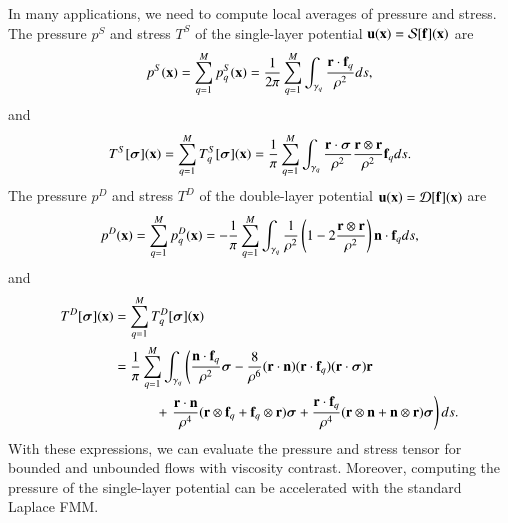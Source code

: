 In many applications, we need to compute local averages of pressure and stress.  The pressure $p^{S}$ and stress $T^{S}$ of the single-layer potential ${\mathbf{u}}({\mathbf{x}}) = {\mathcal{S}}[{\mathbf{f}}]({\mathbf{x}})$ are 
\begin{align*}
  p^{S}({\mathbf{x}}) = \sum_{q=1}^{M} p_{q}^{S}({\mathbf{x}}) = 
    \frac{1}{2\pi} \sum_{q=1}^{M}\int_{\gamma_{q}}
    \frac{{\mathbf{r}} \cdot {\mathbf{f}}_{q}}{\rho^{2}} ds,
\end{align*}
and
\begin{align*}
  T^{S}[{\boldsymbol\sigma}]({\mathbf{x}}) = \sum_{q=1}^{M} T_{q}^{S}[{\boldsymbol\sigma}]({\mathbf{x}}) = 
    \frac{1}{\pi}\sum_{q=1}^{M} \int_{\gamma_{q}} 
    \frac{{\mathbf{r}} \cdot {\boldsymbol\sigma}}{\rho^{2}} 
    \frac{{\mathbf{r}} \otimes {\mathbf{r}}}{\rho^{2}}{\mathbf{f}}_{q} ds.
\end{align*}
The pressure $p^{D}$ and stress $T^{D}$ of the double-layer potential
${\mathbf{u}}({\mathbf{x}}) = {\mathcal{D}}[{\mathbf{f}}]({\mathbf{x}})$ are
\begin{align*}
  p^{D}({\mathbf{x}}) = \sum_{q=1}^{M} p_{q}^{D}({\mathbf{x}}) =
    -\frac{1}{\pi}\sum_{q=1}^{M}\int_{\gamma_{q}}
    \frac{1}{\rho^{2}}\left(1 - 2\frac{{\mathbf{r}} \otimes {\mathbf{r}}}{\rho^{2}}\right)
    {\mathbf{n}} \cdot {\mathbf{f}}_{q} ds,
\end{align*}
and 
\begin{align*}
  T^{D}[{\boldsymbol\sigma}]({\mathbf{x}}) &= \sum_{q=1}^{M}T_{q}^{D}[{\boldsymbol\sigma}]({\mathbf{x}}) \\
  &= \frac{1}{\pi}\sum_{q=1}^{M}\int_{\gamma_{q}}
    \left(\frac{{\mathbf{n}} \cdot {\mathbf{f}}_{q}}{\rho^{2}}{\boldsymbol\sigma} - 
    \frac{8}{\rho^{6}}({\mathbf{r}} \cdot {\mathbf{n}})({\mathbf{r}} \cdot {\mathbf{f}}_{q})
      ({\mathbf{r}} \cdot {\boldsymbol\sigma}){\mathbf{r}} \right.\\ 
    &\hspace{30pt}+\left.\frac{{\mathbf{r}} \cdot {\mathbf{n}}}{\rho^{4}}
      ({\mathbf{r}} \otimes {\mathbf{f}}_{q} + {\mathbf{f}}_{q} \otimes {\mathbf{r}}){\boldsymbol\sigma} +
    \frac{{\mathbf{r}} \cdot {\mathbf{f}}_{q}}{\rho^{4}}
      ({\mathbf{r}} \otimes {\mathbf{n}} + {\mathbf{n}} \otimes {\mathbf{r}}){\boldsymbol\sigma} \right)ds.
\end{align*}
With these expressions, we can evaluate the pressure and stress tensor
for bounded and unbounded flows with viscosity contrast.  Moreover,
computing the pressure of the single-layer potential can be
accelerated with the standard Laplace FMM.

